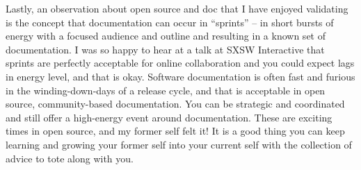 Lastly, an observation about open source and doc that I have enjoyed validating
is the concept that documentation can occur in ``sprints'' -- in short bursts of
energy with a focused audience and outline and resulting in a known set of
documentation. I was so happy to hear at a talk at SXSW Interactive that sprints
are perfectly acceptable for online collaboration and you could expect lags in
energy level, and that is okay. Software documentation is often fast and furious
in the winding-down-days of a release cycle, and that is acceptable in open
source, community-based documentation. You can be strategic and coordinated and
still offer a high-energy event around documentation. These are exciting times
in open source, and my former self felt it! It is a good thing you can keep
learning and growing your former self into your current self with the collection
of advice to tote along with you.
